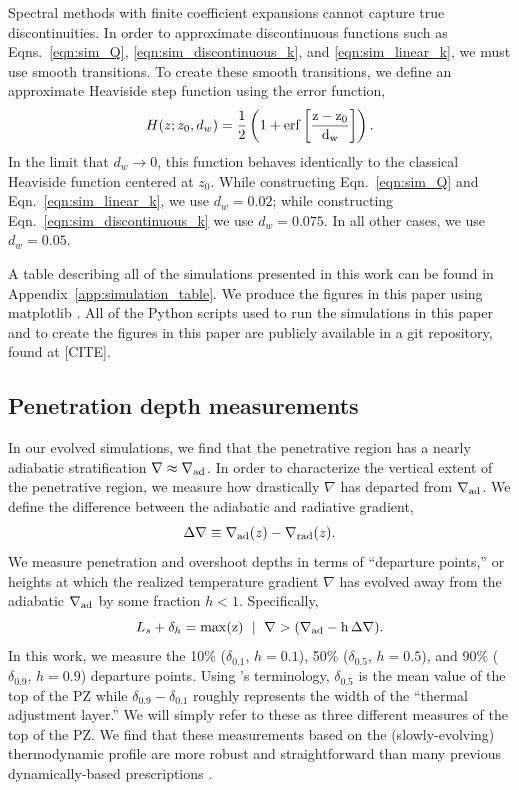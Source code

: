 \documentclass[twocolumn]{aastex631}
\newcommand{\gradrad}{\ensuremath{\nabla_{\rm{rad}}}}
\newcommand{\gradad}{\ensuremath{\nabla_{\rm{ad}}}}
\newcommand{\justgrad}{\ensuremath{\nabla}}
\begin{document}
Spectral methods with finite coefficient expansions cannot capture true discontinuities.
In order to approximate discontinuous functions such as Eqns.~\ref{eqn:sim_Q}, \ref{eqn:sim_discontinuous_k}, and \ref{eqn:sim_linear_k}, we must use smooth transitions.
To create these smooth transitions, we define an approximate Heaviside step function using the error function,
\begin{equation}
H(z; z_0, d_w) = \frac{1}{2}\left(1 + \rm{erf}\left[\frac{z - z_0}{d_w}\right]\right).
\label{eqn:heaviside}
\end{equation}
In the limit that $d_w \rightarrow 0$, this function behaves identically to the classical Heaviside function centered at $z_0$.
While constructing Eqn.~\ref{eqn:sim_Q} and Eqn.~\ref{eqn:sim_linear_k}, we use $d_w = 0.02$; while constructing Eqn.~\ref{eqn:sim_discontinuous_k} we use $d_w = 0.075$.
In all other cases, we use $d_w = 0.05$.

A table describing all of the simulations presented in this work can be found in Appendix~\ref{app:simulation_table}.
We produce the figures in this paper using matplotlib \citep{hunter2007, mpl3.3.4}.
All of the Python scripts used to run the simulations in this paper and to create the figures in this paper are publicly available in a git repository, found at [CITE].

\subsection{Penetration depth measurements}
In our evolved simulations, we find that the penetrative region has a nearly adiabatic stratification $\justgrad \approx \gradad$.
In order to characterize the vertical extent of the penetrative region, we measure how drastically $\justgrad$ has departed from $\gradad$.
We define the difference between the adiabatic and radiative gradient,
\begin{equation}
\Delta\justgrad \equiv \gradad(z) - \gradrad(z).
\end{equation}
We measure penetration and overshoot depths in terms of ``departure points,'' or heights at which the realized temperature gradient $\justgrad$ has evolved away from the adiabatic $\gradad$ by some fraction $h < 1$.
Specifically,
\begin{equation}
L_s + \delta_{h} = \rm{max}(z) \,\,\mid\,\, \justgrad > (\gradad - h\,\Delta\justgrad).
\label{eqn:delta_p_measures}
\end{equation}
In this work, we measure the 10\% ($\delta_{0.1}$, $h=0.1$), 50\% ($\delta_{0.5}$, $h=0.5$), and 90\% ($\delta_{0.9}$, $h=0.9$) departure points.
Using \citet{zahn1991}'s terminology, $\delta_{0.5}$ is the mean value of the top of the PZ while $\delta_{0.9} - \delta_{0.1}$ roughly represents the width of the ``thermal adjustment layer.''
We will simply refer to these as three different measures of the top of the PZ.
We find that these measurements based on the (slowly-evolving) thermodynamic profile are more robust and straightforward than many previous dynamically-based prescriptions \citep[see e.g.,][for a nice discussion]{pratt_etal_2017}.
\end{document}
